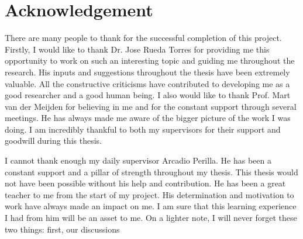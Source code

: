 \chapter*{Acknowledgement}

There are many people to thank for the successful completion of this project. Firstly, I would like to thank Dr. Jose Rueda Torres for providing me this opportunity to work on such an interesting topic and guiding me throughout the research. His inputs and suggestions throughout the thesis have been extremely valuable. All the constructive criticisms have contributed to developing me as a good researcher and a good human being. I also would like to thank Prof. Mart van der Meijden for believing in me and for the constant support through several meetings. He has always made me aware of the bigger picture of the work I was doing. I am incredibly thankful to both my supervisors for their support and goodwill during this thesis. 


I cannot thank enough my daily supervisor Arcadio Perilla. He has been a constant support and a pillar of strength throughout my thesis. This thesis would not have been possible without his help and contribution. He has been a great teacher to me from the start of my project. His determination and motivation to work have always made an impact on me. I am sure that this learning experience I had from him will be an asset to me. On a lighter note, I will never forget these two things: first, our discussions 


